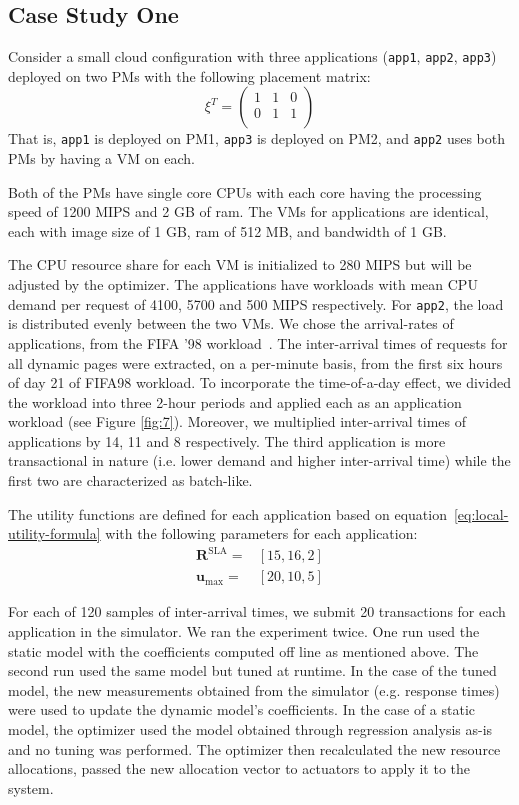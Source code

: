 \subsection{Case Study One}
\label{sec:case-study-test-simple-deploy}
Consider a small cloud configuration with three applications (\texttt{app1}, \texttt{app2}, \texttt{app3}) deployed on two PMs with the following placement matrix:
\[ \xi^T= 
  \left( \begin{array}{ccc}
  1 & 1 & 0 \\
  0 & 1 & 1 \\
\end{array} \right)\] 
That is, \texttt{app1} is deployed on PM1, \texttt{app3} is deployed on PM2, and \texttt{app2} uses both PMs by having a VM on each.

Both of the PMs have single core CPUs with each core having the processing speed of 1200 MIPS and 2 GB of ram. The VMs for applications are identical, each with image size of 1 GB, ram of 512 MB, and bandwidth of 1 GB.

The CPU resource share for each VM is initialized to 280 MIPS but will be adjusted by the optimizer. The applications have workloads with mean CPU demand per request of 4100, 5700 and 500 MIPS respectively. For \texttt{app2}, the load is distributed evenly between the two VMs. We chose the arrival-rates of applications, from the FIFA '98 workload~\cite{arlitt_workload_2000}. The inter-arrival times of requests for all dynamic pages were extracted, on a per-minute basis, from the first six hours of day 21 of FIFA98 workload. To incorporate the time-of-a-day effect, we divided the workload into three 2-hour periods and applied each as an application workload (see Figure \ref{fig:7}). Moreover, we multiplied inter-arrival times of applications by 14, 11 and 8 respectively.
The third application is more transactional in nature (i.e. lower demand and higher inter-arrival time) while the first two are characterized as batch-like.

The utility functions are defined for each application based on equation~\ref{eq:local-utility-formula} with the following parameters for each application:
\begin{align*} \textbf{R}^\text{SLA} = & [15,16,2] \\
 \textbf{u}_{\text{max}} = & [20,10,5]      \end{align*}

For each of 120 samples of inter-arrival times, we submit 20 transactions for each application in the simulator. 
We ran the experiment twice. One run used the static model with the coefficients computed off line as mentioned above.  The second run used the same model but tuned at runtime.
In the case of the tuned model, the new measurements obtained from the simulator (e.g. response times) were used to update the dynamic model's coefficients.  In the case of a static model, the optimizer used the model obtained through regression analysis as-is and no tuning was performed. The optimizer then recalculated the new resource allocations, passed the new allocation vector to actuators to apply it to the system. 

